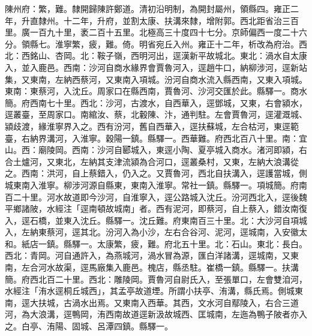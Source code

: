 \begin{pinyinscope}
陳州府：繁，難。隸開歸陳許鄭道。清初沿明制，為開封屬州，領縣四。雍正二年，升直隸州。十二年，升府，並割太康、扶溝來隸，增附郭。西北距省治三百里。廣一百九十里，袤二百十五里。北極高三十度四十七分。京師偏西一度二十六分。領縣七。淮寧繁，疲，難。倚。明省宛丘入州。雍正十二年，析改為府治。西北：西銘山、杏岡。北：鞍子嶺，西明河出，逕漢新平故城北。東北：渦水自太康入，並入鹿邑。西南：沙河自商水緣界會賈魯河入，逕趙牛口，納柳涉河，逕新站集，又東南，左納西蔡河，又東南入項城。汾河自商水流入縣西南，又東入項城。東南：東蔡河，入沈丘。周家口在縣西南，賈魯河、沙河交匯於此。縣驛一。商水簡。府西南七十里。西北：沙河，古渡水，自西華入，逕鄧城，又東，右會潁水，逕叢臺，至周家口。南綰汝、蔡，北轂陳、汴，通判駐。左會賈魯河，逕灌溉城、潁歧渡，緣淮寧界入之。西有汾河，舊自西華入，逕扶蘇城，左合枯河，東逕範臺，右納界溝河，入淮寧。穀陽一鎮。縣驛一。西華難。府西北百八十里。南：宜山。西：廟陵岡。西南：沙河自郾城入，東逕小陶、夏亭城入商水。渚河即潁，右合土爐河，又東北，左納其支津流潁為合河口，逕叢桑村，又東，左納大浪溝從之。西南：洪河，自上蔡錯入，仍入之。又賈魯河，西北自扶溝入，逕護當城，側城東南入淮寧。柳涉河源自縣東，東南入淮寧。常社一鎮。縣驛一。項城簡。府南百二十里。河水故道即今沙河，自淮寧入，逕公路城入沈丘。汾河西北入，逕後魏平鄉諸陂，水經注「逕南頓故城南」者。西有泥河，即蔡河，自上蔡入，錯汝南復入，逕石橋，並東入沈丘。縣驛一。沈丘難。府東南百三十里。北：大沙河自項城入，左納東蔡河，逕其北。汾河入為小沙，左右合谷河、泥河，逕城南，入安徽太和。紙店一鎮。縣驛一。太康繁，疲，難。府北五十里。北：石山。東北：長白。西北：青岡。河自通許入，為燕城河，渦水冒為源，匯白洋諸溝，逕城南，又東南，左合河水故渠，逕馬廠集入鹿邑。槐店，縣丞駐。崔橋一鎮。縣驛一。扶溝簡。府西北百二十里。西北：雕陵岡。賈魯河自尉氏入，至張單口，左會雙洎河，水經注「洧水逕桐丘城西」，其孟亭故道堙。所謂小扶亭、洧溝，縣氏焉。側城東南，逕大扶城，古渦水出焉。又東南入西華。其西，文水河自鄢陵入，右合三道河，為大浪溝，逕鴨岡，洧西南故道逕新汲故城西、匡城南，左迤為鴨子陂者亦入之。白亭、洧陽、固城、呂潭四鎮。縣驛一。


\end{pinyinscope}
